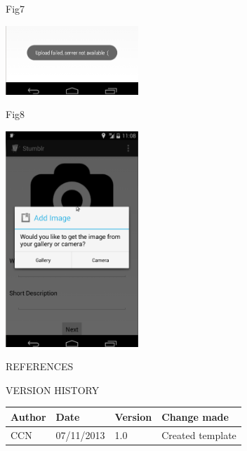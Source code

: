 \documentclass{article}
\begin{document}
\begin{center}
	\clearpage
	Fig7
	
	\includegraphics[width=5cm]{21}

	\vspace{1in}	
	Fig8
	
	\includegraphics[width=5cm]{25}
	
	\end{center}
	\newpage
	
	\nocite{LaTeXTemplate}

	\newpage
	\begin{section}{REFERENCES}
		
		
	\end{section}
	
	\vspace{1cm}
	\begin{section}{VERSION HISTORY}
		\begin{tabularx}{\linewidth}{| p{2cm} | p{2cm} | p{2cm} | X | }
			\hline
			\bf{Author} & \bf{Date} & \bf{Version} & \bf{Change made} \\
			\hline
			CCN & 07/11/2013 & 1.0 & Created template \\
			\hline
		\end{tabularx}
	\end{section}
\end{document}
